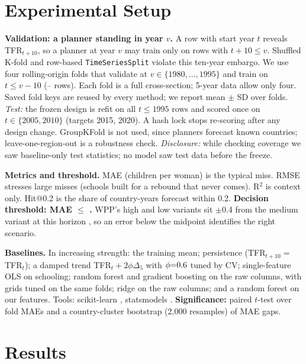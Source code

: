 \documentclass[11pt]{article}
\begin{document}
\section{Experimental Setup}
\label{sec:setup}
\textbf{Validation: a planner standing in year $v$.} A row with start year $t$ reveals TFR$_{t+10}$, so a planner at year $v$ may train only on rows with $t+10\le v$. Shuffled K-fold and row-based \texttt{TimeSeriesSplit} violate this ten-year embargo. We use four rolling-origin folds that validate at $v\in\{1980,\dots,1995\}$ and train on $t\le v-10$ (\foldMinRows--\foldMaxRows{} rows). Each fold is a full cross-section; 5-year data allow only four. Saved fold keys are reused by every method; we report mean $\pm$ SD over folds. \emph{Test:} the frozen design is refit on all $t\le1995$ rows and scored once on $t\in\{2005,2010\}$ (targets 2015, 2020). A hash lock stops re-scoring after any design change. GroupKFold is not used, since planners forecast known countries; leave-one-region-out is a robustness check. \emph{Disclosure:} while checking coverage we saw baseline-only test statistics; no model saw test data before the freeze.

\textbf{Metrics and threshold.} MAE (children per woman) is the typical miss. RMSE stresses large misses (schools built for a rebound that never comes). R$^2$ is context only. Hit@0.2 is the share of country-years forecast within 0.2. \textbf{Decision threshold: MAE $\le$ \threshold.} WPP's high and low variants sit $\pm$0.4 from the medium variant at this horizon \citep{un2024methodology}, so an error below the midpoint identifies the right scenario.

\textbf{Baselines.} In increasing strength: the training mean; persistence (TFR$_{t+10}{=}$TFR$_t$); a damped trend TFR$_t+2\phi\Delta_5$ with $\phi{=}0.6$ tuned by CV; single-feature OLS on schooling; random forest and gradient boosting on the raw columns, with grids tuned on the same folds; ridge on the raw columns; and a random forest on our features. Tools: scikit-learn \citep{pedregosa2011scikit}, statsmodels \citep{seabold2010statsmodels}. \textbf{Significance:} paired $t$-test over fold MAEs and a country-cluster bootstrap (2,000 resamples) of MAE gaps.

\section{Results}
\end{document}
